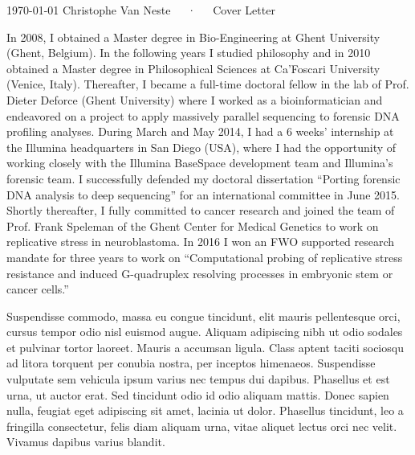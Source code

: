 \documentclass[11pt, a4paper]{awesome-cv}
\begin{document}
\makecvheader[R]

\makecvfooter
  {\today}
  {Christophe Van Neste~~~·~~~Cover Letter}
  {}

\makelettertitle

\begin{cvletter}

   In 2008, I obtained a Master degree in
  Bio-Engineering at Ghent University (Ghent, Belgium). In the
  following years I studied philosophy and in 2010 obtained a Master
  degree in Philosophical Sciences at Ca’Foscari University (Venice,
  Italy). Thereafter, I became a full-time doctoral fellow in the lab
  of Prof. Dieter Deforce (Ghent University) where I worked as a
  bioinformatician and endeavored on a project to apply massively
  parallel sequencing to forensic DNA profiling analyses. During March
  and May 2014, I had a 6 weeks’ internship at the Illumina
  headquarters in San Diego (USA), where I had the opportunity of
  working closely with the Illumina BaseSpace development team and
  Illumina’s forensic team. I successfully defended my doctoral
  dissertation “Porting forensic DNA analysis to deep sequencing” for
  an international committee in June 2015. Shortly thereafter, I fully
  committed to cancer research and joined the team of Prof. Frank
  Speleman of the Ghent Center for Medical Genetics to work on
  replicative stress in neuroblastoma. In 2016 I won an FWO supported
  research mandate for three years to work on “Computational probing
  of replicative stress resistance and induced G-quadruplex resolving
  processes in embryonic stem or cancer cells.”

    Suspendisse commodo, massa eu congue
  tincidunt, elit mauris pellentesque orci, cursus tempor odio nisl
  euismod augue. Aliquam adipiscing nibh ut odio sodales et pulvinar
  tortor laoreet. Mauris a accumsan ligula. Class aptent taciti
  sociosqu ad litora torquent per conubia nostra, per inceptos
  himenaeos. Suspendisse vulputate sem vehicula ipsum varius nec
  tempus dui dapibus. Phasellus et est urna, ut auctor erat. Sed
  tincidunt odio id odio aliquam mattis. Donec sapien nulla, feugiat
  eget adipiscing sit amet, lacinia ut dolor. Phasellus tincidunt, leo
  a fringilla consectetur, felis diam aliquam urna, vitae aliquet
  lectus orci nec velit. Vivamus dapibus varius blandit.


\end{cvletter}
\end{document}
